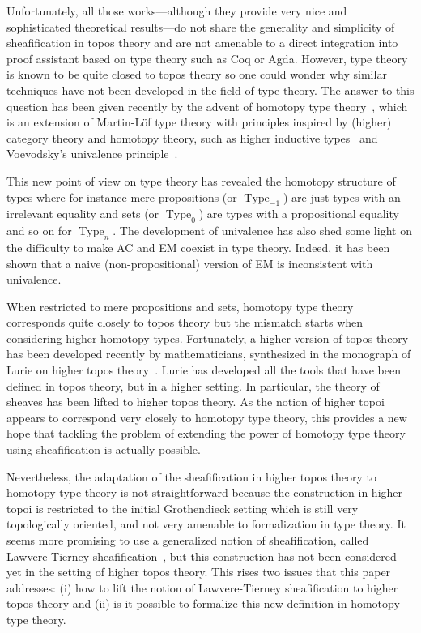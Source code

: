 \documentclass[conference]{IEEEtran}
\DeclareMathOperator{\Type}{Type}
\begin{document}
Unfortunately, all those works---although they provide very nice and
sophisticated theoretical results---do not share the generality and
simplicity of sheafification in topos theory and are not amenable to a
direct integration into proof assistant based on type theory such as
Coq or Agda.  
%
However, type theory is known to be quite closed to topos theory so
one could wonder why similar techniques have not been developed in the
field of type theory. 
%
The answer to this question has been given recently by the advent of
homotopy type theory~\cite{hottbook}, which is an extension of
Martin-Löf type theory with principles inspired by (higher) category
theory and homotopy theory, such as higher inductive
types~\cite{lumsdaine2011higher,lumsdaine2013higher} and
Voevodsky's univalence principle~\cite{kapulkin2012simplicial}. 
%

This new point of view on type theory has revealed the homotopy
structure of types where for instance mere propositions (or
$\Type_{-1}$) are just types with an
irrelevant equality and sets (or $\Type_{0}$) are types
with a propositional equality and so on for $\Type_{n}$.
%
The development of univalence has also shed some light on the
difficulty to make AC and EM coexist in type theory. Indeed, it
has been shown that a naive (non-propositional) version of EM is
inconsistent with univalence.

When restricted to mere propositions and sets, homotopy type
theory corresponds quite closely to topos theory but the mismatch
starts when considering higher homotopy types.
%
Fortunately, a higher version of topos theory has been developed
recently by mathematicians, synthesized in the monograph of Lurie on
higher topos theory~\cite{lurie}. 
%
Lurie has developed all the tools that have been defined in
topos theory, but in a higher setting. In particular, the theory of
sheaves has been lifted to higher topos theory.
%
As the notion of higher topoi appears to correspond very closely to
homotopy type theory, this provides a new hope that tackling the
problem of extending the power of homotopy type theory using
sheafification is actually possible.

Nevertheless, the adaptation of the sheafification in higher topos
theory to homotopy type theory is not straightforward because the
construction in higher topoi is restricted to the initial Grothendieck
setting which is still very topologically oriented, and not very
amenable to formalization in type theory. It seems more promising to
use a generalized notion of sheafification, called Lawvere-Tierney
sheafification~\cite{maclanemoerdijk}, but this construction has not
been considered yet in the setting of higher topos theory. This rises
two issues that this paper addresses: (i) how to lift the notion of
Lawvere-Tierney sheafification to higher topos theory and (ii) is it
possible to formalize this new definition in homotopy type theory.
\end{document}
